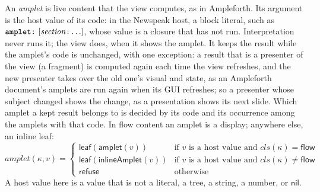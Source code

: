 \documentclass[11pt]{article}
\numberwithin{equation}{section}
\newcommand{\kw}[1]{\ensuremath{\mathsf{#1}}}
\newcommand{\str}[1]{\ensuremath{\text{\texttt{#1}}}}
\begin{document}
An \emph{amplet} is live content that the view computes, as in Ampleforth.
Its argument is the host value of its code: in the Newspeak host, a block
literal, such as $\str{amplet:}~[\mathit{section}\!:\ldots]$, whose value is
a closure that has not run.  Interpretation never runs it; the view does,
when it shows the amplet.  It keeps the result while the amplet's code is
unchanged, with one exception: a result that is a presenter of the view
(a fragment) is computed again each time the view refreshes, and the new
presenter takes over the old one's visual and state, as an Ampleforth
document's amplets are run again when its GUI refreshes; so a presenter
whose subject changed shows the change, as a presentation shows its next
slide.  Which amplet a kept result belongs to is decided by its code and
its occurrence among the amplets with that code.  In flow content an amplet is a display; anywhere else, an inline
leaf:
\begin{equation}\label{eq:lib-amplet}
\mathit{amplet}(\kappa, v) =
\begin{cases}
\kw{leaf}(\kw{amplet}(v)) & \text{if } v \text{ is a host value and }
  \mathit{cls}(\kappa) = \kw{flow} \\
\kw{leaf}(\kw{inlineAmplet}(v)) & \text{if } v \text{ is a host value and }
  \mathit{cls}(\kappa) \ne \kw{flow} \\
\kw{refuse} & \text{otherwise}
\end{cases}
\end{equation}
A host value here is a value that is not a literal, a tree, a string, a
number, or $\kw{nil}$.
\end{document}
